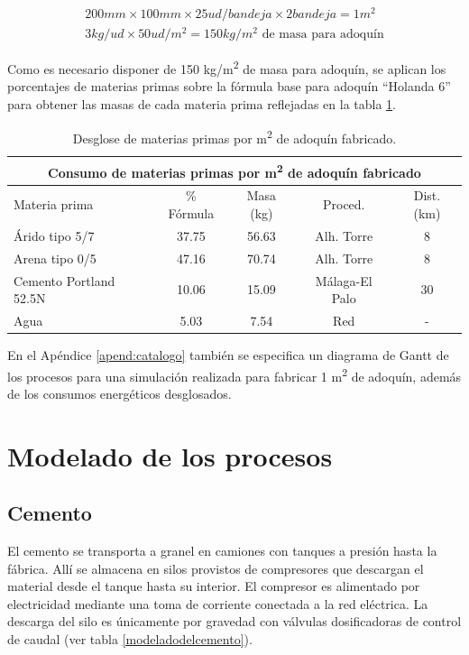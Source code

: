 \begin{gather}
200 mm \times 100 mm \times 25 ud/bandeja \times 2 bandeja = 1 m^2\\
3 kg/ud \times 50 ud/m^2 = 150 kg/m^2 \text{ de masa para adoquín}\label{eq:masa}
\end{gather}

Como es necesario disponer de 150 \si{kg/m^2} de masa para adoquín, se aplican los porcentajes de materias primas sobre la fórmula base para adoquín ``Holanda 6'' para obtener las masas de cada materia prima reflejadas en la tabla \ref{desglosemateriasprimas}.

\begin{table}[!htb]
\centering
\begin{tabular}{lcccc}
\toprule
\multicolumn{5}{c}{Consumo de materias primas por \si{m^2} de adoquín fabricado}\\
\midrule
Materia prima & \% Fórmula & Masa (\si{kg}) & Proced. & Dist. (\si{km})\\
\midrule
Árido tipo 5/7 & 37.75 & 56.63 & Alh. Torre & 8\\
Arena tipo 0/5 & 47.16 & 70.74 & Alh. Torre & 8\\
Cemento Portland 52.5N & 10.06 & 15.09 & Málaga-El Palo & 30\\
Agua & 5.03 & 7.54 & Red & -\\
\bottomrule
\end{tabular}
\caption{Desglose de materias primas por \si{m^2} de adoquín fabricado.}
\label{desglosemateriasprimas}
\end{table}

En el Apéndice \ref{apend:catalogo} también se especifica un diagrama de Gantt de los procesos para una simulación realizada para fabricar 1 \si{m^2} de adoquín, además de los consumos energéticos desglosados.

\section{Modelado de los procesos}
\subsection{Cemento}
El cemento se transporta a granel en camiones con tanques a presión hasta la fábrica. Allí se almacena en silos provistos de compresores que descargan el material desde el tanque hasta su interior. El compresor es alimentado por electricidad mediante una toma de corriente conectada a la red eléctrica. La descarga del silo es únicamente por gravedad con válvulas dosificadoras de control de caudal (ver tabla \ref{modeladodelcemento}).

